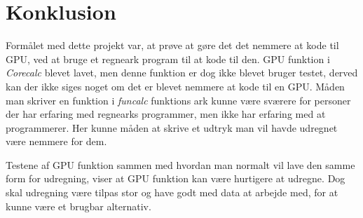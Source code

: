 \section{Konklusion}
\label{KON}
Formålet med dette projekt var, at prøve at gøre det det nemmere at kode til GPU, ved at bruge et regneark program til at kode til den. GPU funktion i \textit{Corecalc} blevet lavet, men denne funktion er dog ikke blevet bruger testet, derved kan der ikke siges noget om det er blevet nemmere at kode til en GPU. Måden man skriver en funktion i \textit{funcalc} funktions ark kunne være sværere for personer der har erfaring med regnearks programmer, men ikke har erfaring med at programmerer. Her kunne måden at skrive et udtryk man vil havde udregnet være nemmere for dem.

Testene af GPU funktion sammen med hvordan man normalt vil lave den samme form for udregning, viser at GPU funktion kan være hurtigere at udregne. Dog skal udregning være tilpas stor og have godt med data at arbejde med, for at kunne være et brugbar alternativ.